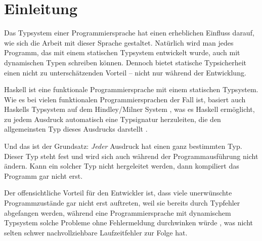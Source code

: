 \section{Einleitung}

\label{sec:einleitung}

Das Typsystem einer Programmiersprache hat einen erheblichen Einfluss darauf, wie sich die Arbeit mit dieser
Sprache gestaltet. Natürlich wird man jedes Programm, das mit einem statischen Typsystem entwickelt wurde,
auch mit dynamischen Typen schreiben können. Dennoch bietet statische Typsicherheit einen nicht zu unterschätzenden Vorteil --
nicht nur während der Entwicklung. 

Haskell ist eine funktionale Programmiersprache mit einem statischen Typ\-sys\-tem. Wie es bei vielen funktionalen
Programmiersprachen der Fall ist, basiert auch Haskells Typsystem auf dem Hindley/Milner System \cite{hindley, milner, damas} , was es
Haskell ermöglicht, zu jedem Ausdruck automatisch eine Typsignatur herzuleiten, die den allgemeinsten Typ dieses Ausdrucks
darstellt \cite{wadler}.

Und das ist der Grundsatz: \textit{Jeder} Ausdruck hat einen ganz bestimmten Typ. Dieser Typ steht fest und wird sich auch während der Programmausführung
nicht ändern. Kann ein solcher Typ nicht hergeleitet werden, dann kompiliert das Programm gar nicht erst.

Der offensichtliche Vorteil für den Entwickler ist, dass viele unerwünschte Programmzustände gar nicht erst auftreten,
weil sie bereits durch Typfehler abgefangen werden, während eine Programmiersprache mit dynamischem Typsystem solche
Probleme ohne Fehlermeldung durchwinken würde , was nicht selten schwer nachvollziehbare Laufzeitfehler zur Folge hat.


